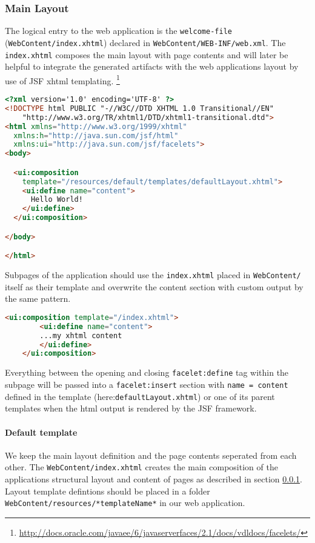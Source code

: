 \subsubsection{Main Layout}
\label{subsec:referenceMainLayout} 

The logical entry to the web application is the \texttt{welcome-file}
(\texttt{WebContent/index.xhtml}) declared in
\texttt{WebContent/WEB-INF/web.xml}. The \texttt{index.xhtml} composes the
main layout with page contents and will later be helpful to integrate the
generated artifacts with the web applications layout by use of JSF xhtml templating.
\footnote{\url{http://docs.oracle.com/javaee/6/javaserverfaces/2.1/docs/vdldocs/facelets/}}

\begin{lstlisting}[language=HTML]
<?xml version='1.0' encoding='UTF-8' ?>
<!DOCTYPE html PUBLIC "-//W3C//DTD XHTML 1.0 Transitional//EN" 
    "http://www.w3.org/TR/xhtml1/DTD/xhtml1-transitional.dtd">
<html xmlns="http://www.w3.org/1999/xhtml"
  xmlns:h="http://java.sun.com/jsf/html"
  xmlns:ui="http://java.sun.com/jsf/facelets">
<body>

  <ui:composition
    template="/resources/default/templates/defaultLayout.xhtml">
    <ui:define name="content">
      Hello World!
    </ui:define>
  </ui:composition>

</body>

</html>
\end{lstlisting}
 
Subpages of the application should use the \texttt{index.xhtml} placed in
\texttt{WebContent/} itself as their template and overwrite the content section
with custom output by the same pattern.

\begin{lstlisting}[language=HTML] 
	<ui:composition template="/index.xhtml">
  		<ui:define name="content">
  		...my xhtml content
  		</ui:define>
 	</ui:composition>
\end{lstlisting}

Everything between the opening and closing \texttt{facelet:define} tag within
the subpage will be passed into a \texttt{facelet:insert} section with
\texttt{name = content} defined in the template
(here:\texttt{defaultLayout.xhtml}) or one of its parent templates when the html
output is rendered by the JSF framework.

\paragraph{Default template}
$\;$ \\
We keep the main layout definition and the page contents seperated from each
other. The \texttt{WebContent/index.xhtml} creates the main composition of the
applications structural layout and content of pages as described in section
\ref{subsec:referenceMainLayout}. Layout template defintions should be placed in
a folder \newline \texttt{WebContent/resources/*templateName*} in our web
application.

